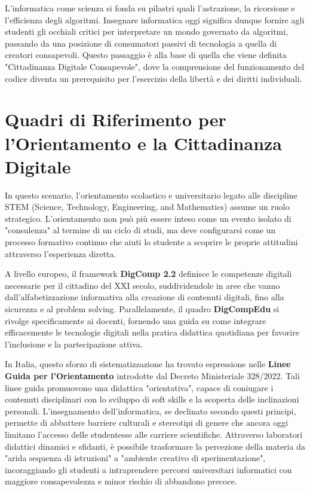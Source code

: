 \documentclass[openany]{theme/uniprthesis}
\begin{document}
L'informatica come scienza si fonda su pilastri quali l'astrazione, la ricorsione e l'efficienza degli algoritmi. Insegnare informatica oggi significa dunque fornire agli studenti gli occhiali critici per interpretare un mondo governato da algoritmi, passando da una posizione di consumatori passivi di tecnologia a quella di creatori consapevoli. Questo passaggio è alla base di quella che viene definita "Cittadinanza Digitale Consapevole", dove la comprensione del funzionamento del codice diventa un prerequisito per l'esercizio della libertà e dei diritti individuali.

\section{Quadri di Riferimento per l'Orientamento e la Cittadinanza Digitale}
In questo scenario, l'orientamento scolastico e universitario legato alle discipline STEM (Science, Technology, Engineering, and Mathematics) assume un ruolo strategico. L'orientamento non può più essere inteso come un evento isolato di "consulenza" al termine di un ciclo di studi, ma deve configurarsi come un processo formativo continuo che aiuti lo studente a scoprire le proprie attitudini attraverso l'esperienza diretta.

A livello europeo, il framework \textbf{DigComp 2.2} \cite{vuorikari2022digcomp} definisce le competenze digitali necessarie per il cittadino del XXI secolo, suddividendole in aree che vanno dall'alfabetizzazione informativa alla creazione di contenuti digitali, fino alla sicurezza e al problem solving. Parallelamente, il quadro \textbf{DigCompEdu} si rivolge specificamente ai docenti, fornendo una guida su come integrare efficacemente le tecnologie digitali nella pratica didattica quotidiana per favorire l'inclusione e la partecipazione attiva.

In Italia, questo sforzo di sistematizzazione ha trovato espressione nelle \textbf{Linee Guida per l'Orientamento} introdotte dal Decreto Ministeriale 328/2022. Tali linee guida promuovono una didattica "orientativa", capace di coniugare i contenuti disciplinari con lo sviluppo di soft skills e la scoperta delle inclinazioni personali. L'insegnamento dell'informatica, se declinato secondo questi principi, permette di abbattere barriere culturali e stereotipi di genere che ancora oggi limitano l'accesso delle studentesse alle carriere scientifiche. Attraverso laboratori didattici dinamici e sfidanti, è possibile trasformare la percezione della materia da "arida sequenza di istruzioni" a "ambiente creativo di sperimentazione", incoraggiando gli studenti a intraprendere percorsi universitari informatici con maggiore consapevolezza e minor rischio di abbandono precoce.
\end{document}
